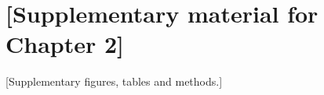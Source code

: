 \chapter{[Supplementary material for Chapter 2]}
\label{app:study1}
[Supplementary figures, tables and methods.]
